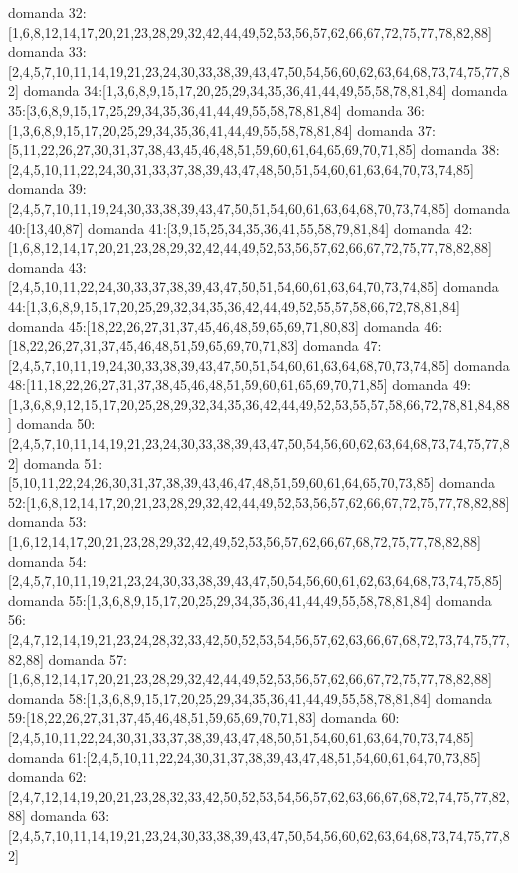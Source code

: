 domanda 32:[1,6,8,12,14,17,20,21,23,28,29,32,42,44,49,52,53,56,57,62,66,67,72,75,77,78,82,88]
domanda 33:[2,4,5,7,10,11,14,19,21,23,24,30,33,38,39,43,47,50,54,56,60,62,63,64,68,73,74,75,77,82]
domanda 34:[1,3,6,8,9,15,17,20,25,29,34,35,36,41,44,49,55,58,78,81,84]
domanda 35:[3,6,8,9,15,17,25,29,34,35,36,41,44,49,55,58,78,81,84]
domanda 36:[1,3,6,8,9,15,17,20,25,29,34,35,36,41,44,49,55,58,78,81,84]
domanda 37:[5,11,22,26,27,30,31,37,38,43,45,46,48,51,59,60,61,64,65,69,70,71,85]
domanda 38:[2,4,5,10,11,22,24,30,31,33,37,38,39,43,47,48,50,51,54,60,61,63,64,70,73,74,85]
domanda 39:[2,4,5,7,10,11,19,24,30,33,38,39,43,47,50,51,54,60,61,63,64,68,70,73,74,85]
domanda 40:[13,40,87]
domanda 41:[3,9,15,25,34,35,36,41,55,58,79,81,84]
domanda 42:[1,6,8,12,14,17,20,21,23,28,29,32,42,44,49,52,53,56,57,62,66,67,72,75,77,78,82,88]
domanda 43:[2,4,5,10,11,22,24,30,33,37,38,39,43,47,50,51,54,60,61,63,64,70,73,74,85]
domanda 44:[1,3,6,8,9,15,17,20,25,29,32,34,35,36,42,44,49,52,55,57,58,66,72,78,81,84]
domanda 45:[18,22,26,27,31,37,45,46,48,59,65,69,71,80,83]
domanda 46:[18,22,26,27,31,37,45,46,48,51,59,65,69,70,71,83]
domanda 47:[2,4,5,7,10,11,19,24,30,33,38,39,43,47,50,51,54,60,61,63,64,68,70,73,74,85]
domanda 48:[11,18,22,26,27,31,37,38,45,46,48,51,59,60,61,65,69,70,71,85]
domanda 49:[1,3,6,8,9,12,15,17,20,25,28,29,32,34,35,36,42,44,49,52,53,55,57,58,66,72,78,81,84,88]
domanda 50:[2,4,5,7,10,11,14,19,21,23,24,30,33,38,39,43,47,50,54,56,60,62,63,64,68,73,74,75,77,82]
domanda 51:[5,10,11,22,24,26,30,31,37,38,39,43,46,47,48,51,59,60,61,64,65,70,73,85]
domanda 52:[1,6,8,12,14,17,20,21,23,28,29,32,42,44,49,52,53,56,57,62,66,67,72,75,77,78,82,88]
domanda 53:[1,6,12,14,17,20,21,23,28,29,32,42,49,52,53,56,57,62,66,67,68,72,75,77,78,82,88]
domanda 54:[2,4,5,7,10,11,19,21,23,24,30,33,38,39,43,47,50,54,56,60,61,62,63,64,68,73,74,75,85]
domanda 55:[1,3,6,8,9,15,17,20,25,29,34,35,36,41,44,49,55,58,78,81,84]
domanda 56:[2,4,7,12,14,19,21,23,24,28,32,33,42,50,52,53,54,56,57,62,63,66,67,68,72,73,74,75,77,82,88]
domanda 57:[1,6,8,12,14,17,20,21,23,28,29,32,42,44,49,52,53,56,57,62,66,67,72,75,77,78,82,88]
domanda 58:[1,3,6,8,9,15,17,20,25,29,34,35,36,41,44,49,55,58,78,81,84]
domanda 59:[18,22,26,27,31,37,45,46,48,51,59,65,69,70,71,83]
domanda 60:[2,4,5,10,11,22,24,30,31,33,37,38,39,43,47,48,50,51,54,60,61,63,64,70,73,74,85]
domanda 61:[2,4,5,10,11,22,24,30,31,37,38,39,43,47,48,51,54,60,61,64,70,73,85]
domanda 62:[2,4,7,12,14,19,20,21,23,28,32,33,42,50,52,53,54,56,57,62,63,66,67,68,72,74,75,77,82,88]
domanda 63:[2,4,5,7,10,11,14,19,21,23,24,30,33,38,39,43,47,50,54,56,60,62,63,64,68,73,74,75,77,82]
